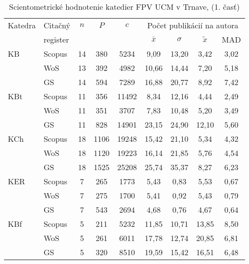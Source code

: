 \
\begin{table}
  \centering\small
  \caption[Hodnotenie FPV\,--\,počet publikácií na autora]{Scientometrické hodnotenie katedier FPV UCM v Trnave, (1. časť)}
  \label{tab:1-staff.results}
  \begin{tabular}{llccccccc}
  \toprule\noalign{\vspace{.3ex}}
 Katedra & Citačný   & $n$  & $P$    & $c$     & \multicolumn{4}{c}{Počet publikácií na autora}  \\
      & register  &    &      &       & $\bar{x}$      & $\sigma$  & $\tilde{x}$   & MAD  \\[0.3ex]
  \midrule\noalign{\vspace{.5ex}}                                                                                                                         
 KB   & Scopus & 14 & 380  & 5234  & 9,09          & 13,20 & 3,42  & 3,02 \\
      & WoS    & 13 & 392  & 4982  & 10,66         & 14,44 & 7,20  & 5,18 \\
      & GS     & 14 & 594  & 7289  & 16,88         & 20,77 & 8,92  & 7,42 \\[1ex]
 KBt  & Scopus & 11 & 356  & 11492 & 8,34          & 12,16 & 4,44  & 2,49 \\
      & WoS    & 11 & 351  & 3707  & 7,83          & 10,48 & 5,20  & 3,49 \\
      & GS     & 11 & 828  & 14901 & 23,15         & 24,90 & 12,10 & 5,60 \\[1ex]
 KCh  & Scopus & 18 & 1106 & 19248 & 15,42         & 21,10 & 5,34  & 4,32 \\
      & WoS    & 18 & 1120 & 19223 & 16,14         & 21,85 & 5,76  & 4,54 \\
      & GS     & 18 & 1525 & 25208 & 25,74         & 35,37 & 8,27  & 6,23 \\[1ex]
 KER  & Scopus & 7  & 265  & 1773  & 5,43          & 0,83  & 5,53  & 0,67 \\
      & WoS    & 7  & 275  & 1700  & 5,41          & 0,92  & 5,43  & 0,79 \\
      & GS     & 7  & 543  & 2694  & 4,68          & 0,76  & 4,67  & 0,64 \\[1ex]
 KBf  & Scopus & 5  & 211  & 5232  & 11,85         & 10,71 & 13,85 & 8,50 \\
      & WoS    & 5  & 261  & 6011  & 17,78         & 12,74 & 20,85 & 6,81 \\
      & GS     & 5  & 320  & 8510  & 19,59         & 15,42 & 16,51 & 6,48 \\[1ex]

\end{tabular}
\end{table}
